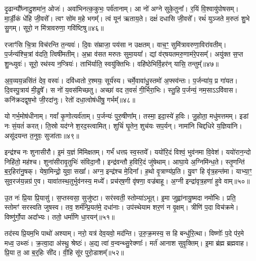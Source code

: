 दृ॒ढान्यौ᳚घ्नादु॒शमा॑न॒ ओजः॑।
अवा॑भिनत्क॒कुभः॒ पर्व॑तानाम्।
आ नो॑ अग्ने सुके॒तुना᳚।
र॒यिं वि॒श्वायु॑पोषसम्।
मा॒र्डी॒कं धे॑हि जी॒वसे᳚।
त्वꣳ सो॑म म॒हे भगम्᳚।
त्वं यून॑ ऋताय॒ते।
दक्षं॑ दधासि जी॒वसे᳚।
रथं॑ युञ्जते म॒रुतः॑ शु॒भे सु॒गम्।
सूरो॒ न मि॑त्रावरुणा॒ गवि॑ष्टिषु॥४६॥

रजाꣳ॑सि चि॒त्रा विच॑रन्ति त॒न्यवः॑।
दि॒वः स॑म्राजा॒ पय॑सा न उक्षतम्।
वाच॒ꣳ॒ सुमि॑त्रावरुणा॒विरा॑वतीम्।
प॒र्जन्य॑श्चि॒त्रां व॑दति॒ त्विषी॑मतीम्।
अ॒भ्रा व॑सत मरुतः सुमा॒यया᳚।
द्यां व॑र्‌\mbox{}षयतमरु॒णाम॑रे॒पसम्᳚।
अयु॑क्त स॒प्त शु॒न्ध्युवः॑।
सूरो॒ रथ॑स्य न॒प्त्रियः॑।
ताभि॑र्याति॒ स्वयु॑क्तिभिः।
वहि॑ष्ठेभिर्वि॒हर॑न् यासि॒ तन्तुम्᳚॥४७॥

अ॒व॒व्यय॒न्नसि॑तं देव॒ वस्वः॑।
दवि॑ध्वतो र॒श्मयः॒ सूर्य॑स्य।
चर्मे॒वावा॑धु॒स्तमो॑ अ॒फ्स्व॑न्तः।
प॒र्जन्या॑य॒ प्र गा॑यत।
दि॒वस्पु॒त्राय॑ मी॒ढुषे᳚।
स नो॑ य॒वस॑मिच्छतु।
अच्छा॑ वद त॒वसं॑ गी॒र्भिरा॒भिः।
स्तु॒हि प॒र्जन्यं॒ नम॒सा\-ऽऽवि॑वास।
कनि॑क्रदद्वृष॒भो जी॒रदा॑नुः।
रेतो॑ दधा॒त्वोष॑धीषु॒ गर्भम्᳚॥४८॥

यो गर्भ॒मोष॑धीनाम्।
गवां᳚ कृ॒णोत्यर्व॑ताम्।
प॒र्जन्यः॑ पुरु॒षीणा᳚म्।
तस्मा॒ इदा॒स्ये॑ ह॒विः।
जु॒होता॒ मधु॑मत्तमम्।
इडां नः सं॒यतं॑ करत्।
ति॒स्रो यद॑ग्ने श॒रद॒स्त्वामित्।
शुचिं॑ घृ॒तेन॒ शुच॑यः सप॒र्यन्।
नामा॑नि चिद्दधिरे य॒ज्ञिया॑नि।
असू॑दयन्त त॒नुवः॒ सुजा॑ताः॥४९॥

इन्द्र॑श्च नः शुनासीरौ।
इ॒मं य॒ज्ञं मि॑मिक्षतम्।
गर्भं॑ धत्तꣴ स्व॒स्तये᳚।
ययो॑रि॒दं विश्वं॒ भुव॑नमा वि॒वेश॑।
ययो॑रान॒न्दो निहि॑तो॒ मह॑श्च।
शुना॑सीरावृ॒तुभिः॑ संविदा॒नौ।
इन्द्र॑वन्तौ ह॒विरि॒दं जु॑षेथाम्।
आघा॒ये अ॒ग्निमि॑न्ध॒ते।
स्तृ॒णन्ति॑ ब॒र्॒हिरा॑नु॒षक्।
येषा॒मिन्द्रो॒ युवा॒ सखा᳚।
अग्न॒ इन्द्र॑श्च मे॒दिना᳚।
ह॒थो वृ॒त्राण्य॑प्र॒ति।
यु॒वꣳ हि वृ॑त्र॒हन्त॑मा।
याभ्या॒ꣳ॒ सुव॒रज॑य॒न्नग्र॑ ए॒व।
यावा॑तस्थ॒तुर्भुव॑नस्य॒ मध्ये᳚।
प्रच॑र्‌\mbox{}ष॒णी वृ॑षणा॒ वज्र॑बाहू।
अ॒ग्नी इन्द्रा॑वृत्र॒हणा॑ हुवे वाम्॥५०॥\anuvakamend[मन॒ इन्द्रो॒ गवि॑ष्टिषु॒ तन्तुं॒ गर्भ॒ꣳ॒ सुजा॑ताः॒ सखा॑ स॒प्त च॑]

उ॒त नः॑ प्रि॒या प्रि॒यासु॑।
स॒प्तस्वसा॒ सुजु॑ष्टा।
सर॑स्वती॒ स्तोम्या॑\-ऽभूत्।
इ॒मा जुह्वा॑नायु॒ष्मदा नमो॑भिः।
प्रति॒ स्तोमꣳ॑ सरस्वति जुषस्व।
तव॒ शर्म॑न्प्रि॒यत॑मे॒ दधा॑नाः।
उप॑स्थेयाम शर॒णं न वृ॒क्षम्।
त्रीणि॑ प॒दा विच॑क्रमे।
विष्णु॑र्गो॒पा अदा᳚भ्यः।
ततो॒ धर्मा॑णि धा॒रयन्॑॥५१॥

तद॑स्य प्रि॒यम॒भि पाथो॑ अश्याम्।
नरो॒ यत्र॑ देव॒यवो॒ मद॑न्ति।
उ॒रु॒क्र॒मस्य॒ स हि बन्धु॑रि॒त्था।
विष्णोः᳚ प॒दे प॑र॒मे मध्व॒ उथ्सः॑।
क्र॒त्वा॒दा अ॑स्थु॒ श्रेष्ठः॑।
अ॒द्य त्वा॑ व॒न्वन्थ्सु॒रेक्णाः᳚।
मर्त॑ आनाश सुवृ॒क्तिम्।
इ॒मा ब्र॑ह्म ब्रह्मवाह।
प्रि॒या त॒ आ ब॒र्॒हिः सी॑द।
वी॒हि सू॑र पुरो॒डाशम्᳚॥५२॥

